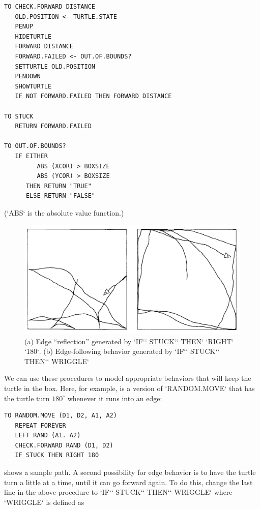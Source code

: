 \documentclass{book}
\begin{document}
\begin{verbatim}
TO CHECK.FORWARD DISTANCE
   OLD.POSITION <- TURTLE.STATE
   PENUP
   HIDETURTLE
   FORWARD DISTANCE
   FORWARD.FAILED <- OUT.OF.BOUNDS?
   SETTURTLE OLD.POSITION
   PENDOWN
   SHOWTURTLE
   IF NOT FORWARD.FAILED THEN FORWARD DISTANCE

TO STUCK
   RETURN FORWARD.FAILED

TO OUT.OF.BOUNDS?
   IF EITHER
         ABS (XCOR) > BOXSIZE
         ABS (YCOR) > BOXSIZE
      THEN RETURN "TRUE"
      ELSE RETURN "FALSE"
\end{verbatim}(\textsc{`ABS`} is the absolute value function.)

\begin{figure}
\begin{center}
\includegraphics[scale=1]{fig2-2}
\caption{(a) Edge ``reflection'' generated by \textsc{`IF`}\textsc{` STUCK`}\textsc{` THEN`} \textsc{`RIGHT`} \textsc{`180`}. (b) Edge-following behavior generated by \textsc{`IF`}\textsc{` STUCK`}\textsc{` THEN`}\textsc{` WRIGGLE`}}
\end{center}
\end{figure}

We can use these procedures to model appropriate behaviors that
will keep the turtle in the box. Here, for example, is a version of
\textsc{`RANDOM.MOVE`} that has the turtle turn $180^{\circ}$ whenever it runs into an
edge:

\begin{verbatim}
TO RANDOM.MOVE (D1, D2, A1, A2)
   REPEAT FOREVER
   LEFT RAND (A1. A2)
   CHECK.FORWARD RAND (D1, D2)
   IF STUCK THEN RIGHT 180
\end{verbatim}
shows a sample path. A second possibility for edge behavior
is to have the turtle turn a little at a time, until it can go forward again.
To do this, change the last line in the above procedure to \textsc{`IF`}\textsc{` STUCK`}\textsc{` THEN`}\textsc{` WRIGGLE`} where \textsc{`WRIGGLE`} is defined as
\end{document}

